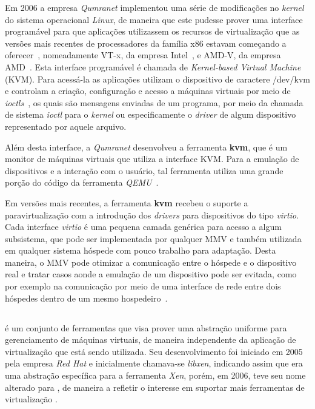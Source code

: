 Em 2006 a empresa \emph{Qumranet} implementou uma série de modificações no
\emph{kernel} do sistema operacional \emph{Linux}, de maneira que este pudesse prover
uma interface programável para que aplicações utilizassem os recursos de
virtualização que as versões mais recentes de processadores da família
x86 estavam começando a oferecer~\cite{kerneltrap2007avi}, nomeadamente
VT-x, da empresa Intel~\cite{uhlig2005intel}, e AMD-V, da empresa
AMD~\cite{strongin2005trusted}.  Esta interface programável é chamada de
\emph{Kernel-based Virtual Machine} (KVM). Para acessá-la as aplicações
utilizam o dispositivo de caractere /dev/kvm e controlam a criação,
configuração e acesso a máquinas virtuais por meio de
\emph{ioctls}~\cite{kivity2007kvm}, os quais são mensagens enviadas de um programa,
por meio da chamada de sistema \emph{ioctl} para o \emph{kernel} ou especificamente o
\emph{driver} de algum dispositivo representado por aquele arquivo.

Além desta interface, a \emph{Qumranet} desenvolveu a ferramenta \textbf{kvm},
que é um monitor de máquinas virtuais que utiliza a interface KVM. Para a
emulação de dispositivos e a interação com o usuário, tal ferramenta utiliza uma grande
porção do código da ferramenta \emph{QEMU}~\cite{kerneltrap2007avi}.

Em versões mais recentes, a ferramenta \textbf{kvm} recebeu o suporte a
paravirtualização com a introdução dos \emph{drivers} para dispositivos do tipo
\emph{virtio}. Cada interface \emph{virtio} é uma pequena camada genérica para
acesso a algum subsistema, que pode ser implementada por qualquer MMV e também
utilizada em qualquer sistema hóspede com pouco trabalho para adaptação. Desta
maneira, o MMV pode otimizar a comunicação entre o hóspede e o dispositivo real
e tratar casos aonde a emulação de um dispositivo pode ser evitada, como
por exemplo na comunicação por meio de uma interface de rede entre dois
hóspedes dentro de um mesmo hospedeiro~\cite{russell2008virtio}.


\subsection{\libvirt}\label{sec:libvirt}


\libvirt{} é um conjunto de ferramentas que visa prover uma abstração
uniforme para gerenciamento de máquinas virtuais, de maneira independente 
da aplicação de virtualização que está sendo utilizada. Seu desenvolvimento
foi iniciado em 2005 pela empresa \emph{Red Hat} e inicialmente chamava-se
\emph{libxen}, indicando assim que era uma abstração específica para a
ferramenta \emph{Xen}, porém, em 2006, teve seu nome alterado para
\libvirt{}, de maneira a refletir o interesse em suportar mais ferramentas
de virtualização .

